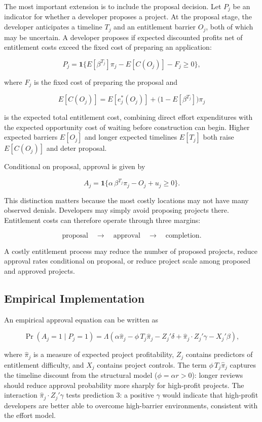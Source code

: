 \documentclass[12pt]{article}
\theoremstyle{definition}
\begin{document}
The most important extension is to include the proposal decision. Let $P_j$ be an indicator for whether a developer proposes a project. At the proposal stage, the developer anticipates a timeline $T_j$ and an entitlement barrier $O_j$, both of which may be uncertain. A developer proposes if expected discounted profits net of entitlement costs exceed the fixed cost of preparing an application:

\[
P_j =
\mathbf{1}
\{
E\!\left[\beta^{T_j}\right]\pi_j - E[C(O_j)] - F_j \geq 0
\},
\]

where $F_j$ is the fixed cost of preparing the proposal and

\[
E[C(O_j)] = E\!\left[e_j^*(O_j)\right] + \bigl(1 - E[\beta^{T_j}]\bigr)\pi_j
\]

is the expected total entitlement cost, combining direct effort expenditures with the expected opportunity cost of waiting before construction can begin. Higher expected barriers $E[O_j]$ and longer expected timelines $E[T_j]$ both raise $E[C(O_j)]$ and deter proposal.

Conditional on proposal, approval is given by

\[
A_j =
\mathbf{1}
\{
\alpha\,\beta^{T_j}\pi_j - O_j + u_j \geq 0
\}.
\]

This distinction matters because the most costly locations may not have many observed denials. Developers may simply avoid proposing projects there. Entitlement costs can therefore operate through three margins:

\[
\text{proposal}
\quad \rightarrow \quad
\text{approval}
\quad \rightarrow \quad
\text{completion}.
\]

A costly entitlement process may reduce the number of proposed projects, reduce approval rates conditional on proposal, or reduce project scale among proposed and approved projects.

\subsection{Empirical Implementation}

An empirical approval equation can be written as

\[
\Pr(A_j=1 \mid P_j=1)
=
\Lambda
\left(
\alpha \widehat{\pi}_j
-
\phi\,T_j\widehat{\pi}_j
-
Z_j'\delta
+
\widehat{\pi}_j\cdot Z_j'\gamma
-
X_j'\beta
\right),
\]

where $\widehat{\pi}_j$ is a measure of expected project profitability, $Z_j$ contains predictors of entitlement difficulty, and $X_j$ contains project controls. The term $\phi\,T_j\widehat{\pi}_j$ captures the timeline discount from the structural model ($\phi = \alpha r > 0$): longer reviews should reduce approval probability more sharply for high-profit projects. The interaction $\widehat{\pi}_j \cdot Z_j'\gamma$ tests prediction 3: a positive $\gamma$ would indicate that high-profit developers are better able to overcome high-barrier environments, consistent with the effort model.
\end{document}
